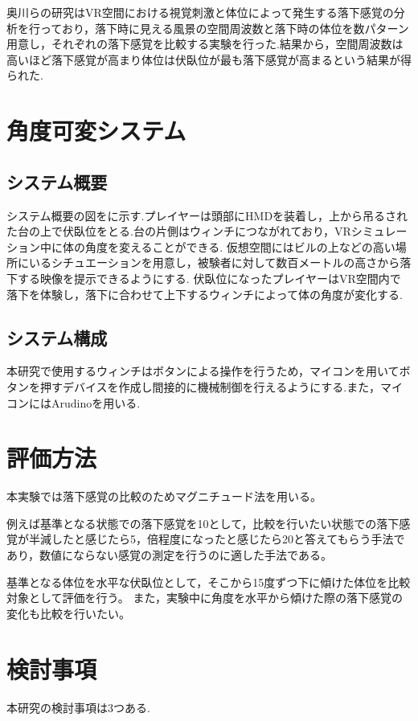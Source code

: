\documentclass[uplatex]{jsarticle}
\begin{document}
奥川らの研究\cite{spatial_stimulation_effect_falling}はVR空間における視覚刺激と体位によって発生する落下感覚の分析を行っており，落下時に見える風景の空間周波数と落下時の体位を数パターン用意し，それぞれの落下感覚を比較する実験を行った.結果から，空間周波数は高いほど落下感覚が高まり体位は伏臥位が最も落下感覚が高まるという結果が得られた.


 

\section{角度可変システム}
\subsection{システム概要}
システム概要の図をに示す.プレイヤーは頭部にHMDを装着し，上から吊るされた台の上で伏臥位をとる.台の片側はウィンチにつながれており，VRシミュレーション中に体の角度を変えることができる.
仮想空間にはビルの上などの高い場所にいるシチュエーションを用意し，被験者に対して数百メートルの高さから落下する映像を提示できるようにする.
伏臥位になったプレイヤーはVR空間内で落下を体験し，落下に合わせて上下するウィンチによって体の角度が変化する.

\subsection{システム構成}
本研究で使用するウィンチはボタンによる操作を行うため，マイコンを用いてボタンを押すデバイスを作成し間接的に機械制御を行えるようにする.また，マイコンにはArudinoを用いる.

\section{評価方法}
本実験では落下感覚の比較のためマグニチュード法を用いる。

例えば基準となる状態での落下感覚を10として，比較を行いたい状態での落下感覚が半減したと感じたら5，倍程度になったと感じたら20と答えてもらう手法であり，数値にならない感覚の測定を行うのに適した手法である。

基準となる体位を水平な伏臥位として，そこから15度ずつ下に傾けた体位を比較対象として評価を行う。
また，実験中に角度を水平から傾けた際の落下感覚の変化も比較を行いたい。

\section{検討事項}
本研究の検討事項は3つある.
\end{document}
